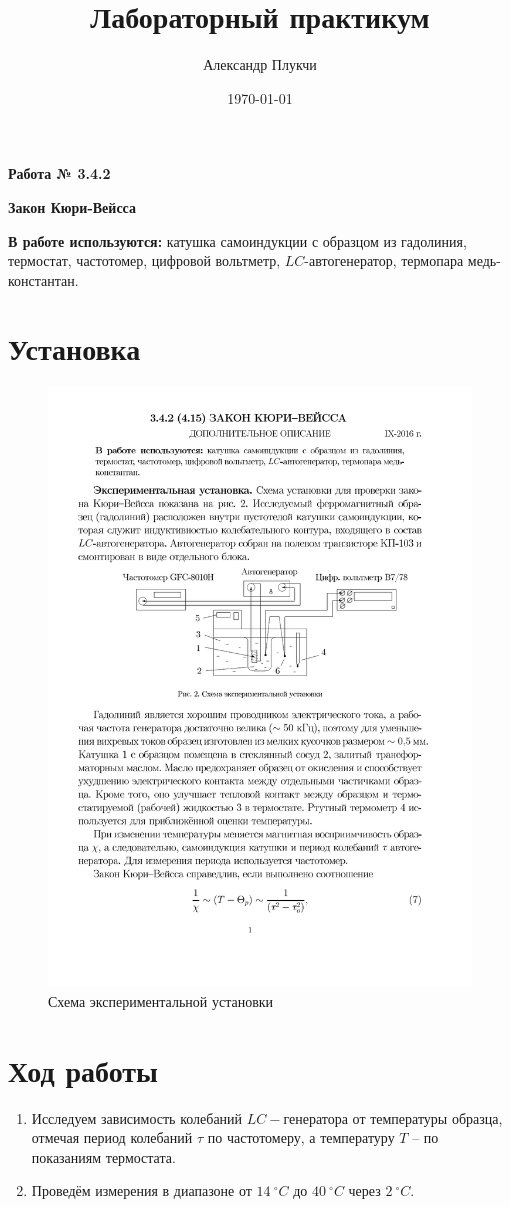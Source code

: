 \documentclass[a4paper,12pt]{article}
\author{Александр Плукчи}
\title{Лабораторный практикум}
\date{\today}
\begin{document}
	\textbf{Работа № 3.4.2}
	
	\textbf{\Large{Закон Кюри-Вейсса}}
	
	\textbf{В работе используются:} катушка самоиндукции с образцом из гадолиния, термостат, частотомер, цифровой вольтметр, $ LC $-автогенератор, термопара медь-константан.
	\section*{Установка}
		\begin{figure}[H]
			\label{inst}
			\caption{Схема экспериментальной установки}
			\includegraphics[scale=1]{inst.pdf}
		\end{figure}
	\section*{Ход работы}
		\begin{enumerate}
			\item Исследуем зависимость колебаний $ LC- $генератора от температуры образца, отмечая период колебаний $ \tau $ по частотомеру, а температуру $ T $ -- по показаниям термостата.
			\item Проведём измерения в диапазоне от $ 14\:^{\circ} C $ до $ 40\:^{\circ} C$ через $ 2\:^\circ C $.
		\end{enumerate}
\end{document}
